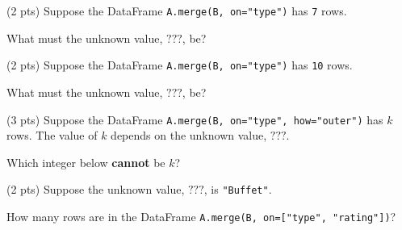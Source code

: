 \documentclass[twoside,12pt]{article}
\begin{document}
\begin{probset}
\begin{prob}[(9 pts)]
\begin{subprobset}

\begin{subprob}(2 pts) Suppose the DataFrame \texttt{A.merge(B, on="type")} has \texttt{7} rows.

What must the unknown value, $\boxed{\text{???}}$, be?

\end{subprob}

\vspace{0.3in}

\begin{subprob}(2 pts) Suppose the DataFrame \texttt{A.merge(B, on="type")} has \texttt{10} rows.

What must the unknown value, $\boxed{\text{???}}$, be?


\end{subprob}

\vspace{0.3in}

\begin{subprob}(3 pts) Suppose the DataFrame \texttt{A.merge(B, on="type", how="outer")} has $k$ rows. The value of $k$ depends on the unknown value, $\boxed{\text{???}}$.

Which integer below \textbf{cannot} be $k$?




    

\end{subprob}

\vspace{0.9in}

\begin{subprob}(2 pts) Suppose the unknown value, $\boxed{\text{???}}$, is \texttt{"Buffet"}.

How many rows are in the DataFrame \texttt{A.merge(B, on=["type", "rating"])}?


\end{subprob}
\end{subprobset}
\end{prob}
\end{probset}
\end{document}
